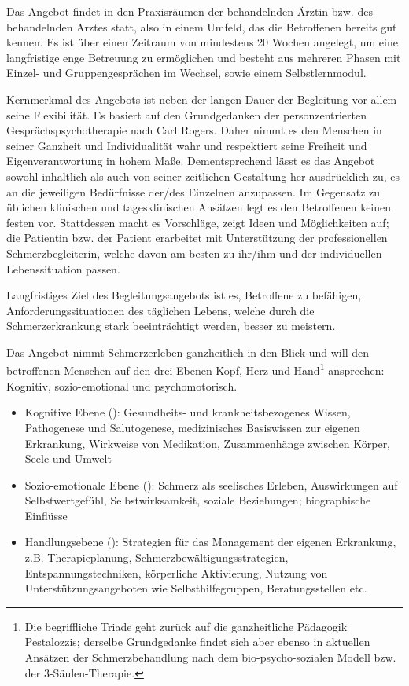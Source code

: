 \documentclass[
  parskip=half,
  DIV=11,
]{scrartcl}
\begin{document}
\begin{multicols}{2}
Das Angebot findet in den Praxisräumen der behandelnden Ärztin bzw. des behandelnden Arztes statt,
also in einem Umfeld, das die Betroffenen bereits gut kennen. Es ist über einen Zeitraum von
mindestens 20 Wochen angelegt, um eine langfristige enge Betreuung zu ermöglichen und besteht aus
mehreren Phasen mit Einzel- und Gruppengesprächen im Wechsel, sowie einem Selbstlernmodul. 

Kernmerkmal des Angebots ist neben der langen Dauer der Begleitung vor allem seine Flexibilität. Es
basiert auf den Grundgedanken der personzentrierten Gesprächspsychotherapie nach Carl Rogers. Daher
nimmt es den Menschen in seiner Ganzheit und Individualität wahr und respektiert seine Freiheit und
Eigenverantwortung in hohem Maße. Dementsprechend lässt es das Angebot sowohl inhaltlich als auch
von seiner zeitlichen Gestaltung her ausdrücklich zu, es an die jeweiligen Bedürfnisse der/des
Einzelnen anzupassen. Im Gegensatz zu üblichen klinischen und tagesklinischen Ansätzen legt es den
Betroffenen keinen festen  vor. Stattdessen macht es Vorschläge, zeigt Ideen
und Möglichkeiten auf; die Patientin bzw. der Patient erarbeitet mit Unterstützung der professionellen Schmerzbegleiterin,
welche davon am besten zu ihr/ihm und der individuellen Lebenssituation passen.

Langfristiges Ziel des Begleitungsangebots ist es, Betroffene zu befähigen, Anforderungssituationen des
täglichen Lebens, welche durch die Schmerzerkrankung stark beeinträchtigt werden, besser zu
meistern. 

Das Angebot nimmt Schmerzerleben ganzheitlich in den Blick und will den betroffenen Menschen auf
den drei Ebenen Kopf, Herz und Hand\footnote{Die begriffliche Triade geht zurück auf die
ganzheitliche Pädagogik Pestalozzis; derselbe Grundgedanke findet sich aber ebenso in aktuellen
Ansätzen der Schmerzbehandlung nach dem bio-psycho-sozialen Modell bzw. der 3-Säulen-Therapie.}
ansprechen: Kognitiv, sozio-emotional und psychomotorisch. 
\begin{itemize}
\item Kognitive Ebene (): Gesundheits- und krankheitsbezogenes Wissen, Pathogenese
und Salutogenese, medizinisches Basiswissen zur eigenen Erkrankung, Wirkweise von Medikation,
Zusammenhänge zwischen Körper, Seele und Umwelt
\item Sozio-emotionale Ebene (): Schmerz als seelisches Erleben, Auswirkungen auf
Selbstwertgefühl, Selbstwirksamkeit, soziale Beziehungen; biographische Einflüsse
\item Handlungsebene (): Strategien für das Management der eigenen
Erkrankung, z.B. Therapieplanung, Schmerzbewältigungsstrategien, Entspannungstechniken, körperliche
Aktivierung, Nutzung von Unterstützungsangeboten wie Selbsthilfegruppen, Beratungsstellen etc.
\end{itemize}


\end{multicols}
\end{document}
